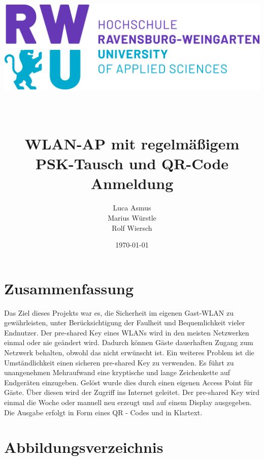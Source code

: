 \documentclass[a4paper,11pt,singlespacing]{article}
\begin{document}
	\setlength{\parindent}{0ex}
	
	\begin{titlepage}
		\author{Luca Asmus\\ Marius Würstle\\Rolf Wiersch}
		\title{\includegraphics[scale=0.3]{rwu_logo_hor-lila-cyan_rgb_0} \\ ~\\ ~\\ WLAN-AP mit regelmäßigem PSK-Tausch und QR-Code Anmeldung \vspace{8cm}}
		\date{\today}
		\maketitle
		\thispagestyle{empty}
    	\end{titlepage}
    	
    	\section{Zusammenfassung}
    	Das Ziel dieses Projekts war es, die Sicherheit im eigenen Gast-WLAN zu gewährleisten, unter Berücksichtigung der Faulheit und Bequemlichkeit vieler Endnutzer. Der pre-shared Key eines WLANs wird in den meisten Netzwerken einmal oder nie geändert wird. Dadurch können Gäste dauerhaften Zugang zum Netzwerk behalten, obwohl das nicht erwünscht ist. Ein weiteres Problem ist die Umständlichkeit einen sicheren pre-shared Key zu verwenden. Es führt zu unangenehmen Mehraufwand eine kryptische und lange Zeichenkette auf Endgeräten einzugeben. Gelöst wurde dies durch einen eigenen Access Point für Gäste. Über diesen wird der Zugriff ins Internet geleitet. Der pre-shared Key wird einmal die Woche oder manuell neu erzeugt und auf einem Display ausgegeben. Die Ausgabe erfolgt in Form eines QR - Codes und in Klartext.   \\

    	
    	
    	\tableofcontents
    	\newpage
    	
    	\section{Abbildungsverzeichnis}
    	\listoffigures
    	\newpage
    	
\end{document}
